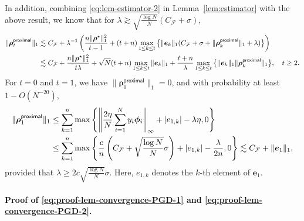\documentclass[english]{article}
\begin{document}
In addition, combining \eqref{eq:lem-estimator-2} in Lemma~\ref{lem:estimator} with the above result, we know that for $\lambda\gtrsim \sqrt{\frac{\log N}{N}}(C_{\mathcal{F}} + \sigma)$,
%
\begin{align*}
\|{\bm \rho}_t^{\mathsf{proximal}}\|_1
&\lesssim C_{\mathcal{F}} + \lambda^{-1}\left(\frac{n\|{\bm \rho}^{\star}\|_1^2}{t-1} + (t+n)\max_{1\le k\le t} \big\{ \|{\bm e}_{k}\|_1(C_{\mathcal{F}} + \sigma + \|{\bm \rho}_{k}^{\mathsf{proximal}}\|_1 + \lambda)\big\}\right) \notag\\
&\lesssim C_{\mathcal{F}} + \frac{n\|{\bm \rho}^{\star}\|_1^2}{t\lambda} + \sqrt{N}(t+n)\max_{1\le k\le t}\|{\bm e}_{k}\|_1 + \frac{t+n}{\lambda}\max_{1\le k\le t}\big\{\|{\bm e}_k\|_1\|{\bm \rho}_k^{\mathsf{proximal}}\|_1\big\},\quad t\ge 2.
\end{align*}
%
For $t=0$ and $t=1$, we have $\|{\bm \rho}_0^{\mathsf{proximal}} \|_1=0$, and with probability at least $1-O(N^{-20})$,
%
\begin{align*}
\|{\bm \rho}_1^{\mathsf{proximal}}\|_1
&\le \sum_{k=1}^n\max\left\{\left\|\frac{2\eta}{N}\sum_{i=1}^Ny_i{\bm \phi}_i\right\|_{\infty} +|{e}_{1,k}| - \lambda\eta ,0\right\}\notag\\
&\le \sum_{k=1}^n\max\left\{\frac{c}{n}\left(C_{\mathcal{F}} + \sqrt{\frac{\log N}{N}}\sigma\right) + |{e}_{1,k}| -\frac{\lambda}{2n}  ,0\right\}\lesssim C_{\mathcal{F}}+ \|{\bm e}_1\|_1,
\end{align*}
%
provided that $\lambda\ge 2c\sqrt{\frac{\log N}{N}}\sigma$. Here,  $e_{1,k}$ denotes the $k$-th element of ${\bm e}_1$.


\paragraph{Proof of \eqref{eq:proof-lem-convergence-PGD-1} and \eqref{eq:proof-lem-convergence-PGD-2}.}
\end{document}
